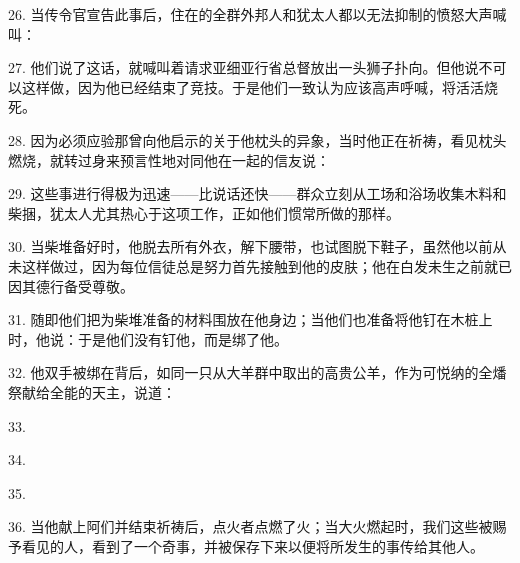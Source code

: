 26. 当传令官宣告此事后，住在的全群外邦人和犹太人都以无法抑制的愤怒大声喊叫：\par

27. 他们说了这话，就喊叫着请求亚细亚行省总督放出一头狮子扑向。但他说不可以这样做，因为他已经结束了竞技。于是他们一致认为应该高声呼喊，将活活烧死。\par

28. 因为必须应验那曾向他启示的关于他枕头的异象，当时他正在祈祷，看见枕头燃烧，就转过身来预言性地对同他在一起的信友说：\par

29. 这些事进行得极为迅速——比说话还快——群众立刻从工场和浴场收集木料和柴捆，犹太人尤其热心于这项工作，正如他们惯常所做的那样。\par

30. 当柴堆备好时，他脱去所有外衣，解下腰带，也试图脱下鞋子，虽然他以前从未这样做过，因为每位信徒总是努力首先接触到他的皮肤；他在白发未生之前就已因其德行备受尊敬。\par

31. 随即他们把为柴堆准备的材料围放在他身边；当他们也准备将他钉在木桩上时，他说：于是他们没有钉他，而是绑了他。\par

32. 他双手被绑在背后，如同一只从大羊群中取出的高贵公羊，作为可悦纳的全燔祭献给全能的天主，说道：\par

33. \par

34. \par

35. \par

36. 当他献上阿们并结束祈祷后，点火者点燃了火；当大火燃起时，我们这些被赐予看见的人，看到了一个奇事，并被保存下来以便将所发生的事传给其他人。\par

